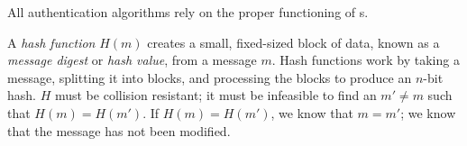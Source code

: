 All authentication algorithms rely on the proper functioning of s.
\begin{definition}\label{def:Hash_Function}
  A \emph{hash function} $H(m)$ creates a small, fixed-sized block of data, known as a \emph{message digest} or \emph{hash value}, from a message $m$.
  Hash functions work by taking a message, splitting it into blocks, and processing the blocks to produce an $n$-bit hash.
  $H$ must be collision resistant; it must be infeasible to find an $m' \neq m$ such that $H(m) = H(m')$.
  If $H(m) = H(m')$, we know that $m = m'$; we know that the message has not been modified.
\end{definition}


